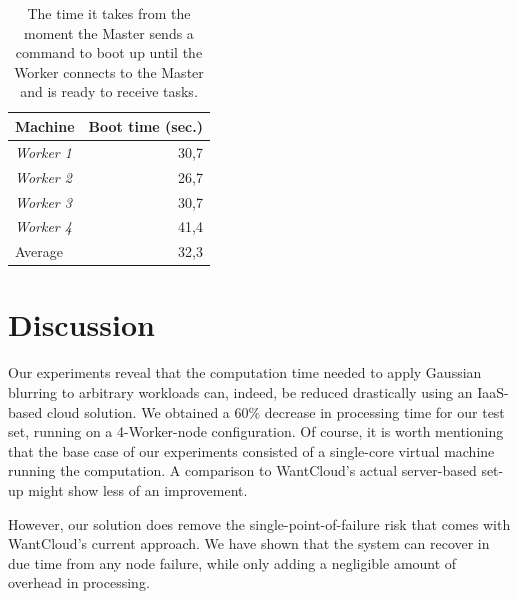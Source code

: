\documentclass{acm_proc_article-sp}
\begin{document}
\begin{table}
	\centering
	\begin{tabular}{| l | r |}
		\hline
		Machine & Boot time (sec.) \\ \hline \hline
		\emph{Worker 1} & 30,7 \\ \hline
		\emph{Worker 2} & 26,7 \\ \hline
		\emph{Worker 3} & 30,7 \\ \hline
		\emph{Worker 4} & 41,4 \\ \hline \hline
		Average & 32,3 \\ \hline
	\end{tabular}
	\caption{The time it takes from the moment the Master sends a command to boot up until the Worker connects to the Master and is ready to receive tasks.}
	\label{tbl:boottimes}
\end{table}


\section{Discussion}
\label{sec:discussion}

Our experiments reveal that the computation time needed to apply Gaussian blurring to arbitrary workloads can, indeed, be reduced drastically using an IaaS-based cloud solution. 
We obtained a 60\% decrease in processing time for our test set, running on a 4-Worker-node configuration. 
Of course, it is worth mentioning that the base case of our experiments consisted of a single-core virtual machine running the computation. 
A comparison to WantCloud's actual server-based set-up might show less of an improvement.

However, our solution does remove the single-point-of-failure risk that comes with WantCloud's current approach.
We have shown that the system can recover in due time from any node failure, while only adding a negligible amount of overhead in processing.
\end{document}
